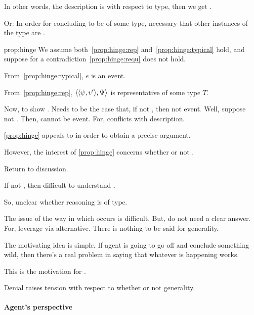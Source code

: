 \begin{note}
  In other words, the description is with respect to type, then we get \requ{}.

  Or:
  In order for concluding to be of some type, necessary that other instances of the type are .

  \begin{argument}{prop:hinge}
    We assume both~\ref{prop:hinge:rep} and~\ref{prop:hinge:typical} hold, and suppose for a contradiction~\ref{prop:hinge:requ} does not hold.

    From~\ref{prop:hinge:typical}, \(e\) is an event.

    From~\ref{prop:hinge:rep}, \(\langle \langle \psi, v' \rangle, \Psi \rangle\) is representative of some type \(T\).

    Now, to show \requ{}.
    Needs to be the case that, if not \fc{}, then not event.
    Well, suppose not \fc{}.
    Then, cannot be event.
    For, conflicts with description.
  \end{argument}
\end{note}

\begin{note}
  \autoref{prop:hinge} appeals to \sTR{} in order to obtain a precise argument.

  However, the interest of \autoref{prop:hinge} concerns whether or not \tR{}.

  Return to discussion.

  If not \sTR{}, then difficult to understand \tR{}.

  So, unclear whether reasoning is of type.

  The issue of the way in which \ninf{} occurs is difficult.
  But, do not need a clear answer.
  For, leverage via alternative.
  There is nothing to be said for generality.
\end{note}

\begin{note}
  The motivating idea is simple.
  If agent is going to go off and conclude something wild, then there's a real problem in saying that whatever is happening works.
\end{note}

\begin{note}
  This is the motivation for .

  Denial raises tension with respect to whether or not generality.
\end{note}


\newpage

\paragraph{Agent's perspective}

